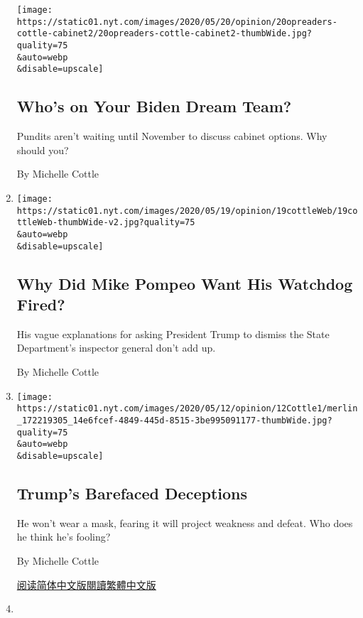 \begin{enumerate}
  \texttt{[image: https://static01.nyt.com/images/2020/05/20/opinion/20opreaders-cottle-cabinet2/20opreaders-cottle-cabinet2-thumbWide.jpg?quality=75\\\&auto=webp\\\&disable=upscale]}

  \hypertarget{whos-on-your-biden-dream-team}{%
  \subsection{Who's on Your Biden Dream
  Team?}\label{whos-on-your-biden-dream-team}}

  Pundits aren't waiting until November to discuss cabinet options. Why
  should you?

  By Michelle Cottle
\item
  \href{/2020/05/19/opinion/pompeo-state-department-inspector-general.html}{}

  \texttt{[image: https://static01.nyt.com/images/2020/05/19/opinion/19cottleWeb/19cottleWeb-thumbWide-v2.jpg?quality=75\\\&auto=webp\\\&disable=upscale]}

  \hypertarget{why-did-mike-pompeo-want-his-watchdog-fired}{%
  \subsection{Why Did Mike Pompeo Want His Watchdog
  Fired?}\label{why-did-mike-pompeo-want-his-watchdog-fired}}

  His vague explanations for asking President Trump to dismiss the State
  Department's inspector general don't add up.

  By Michelle Cottle
\item
  \href{/2020/05/12/opinion/trump-pence-coronavirus-masks.html}{}

  \texttt{[image: https://static01.nyt.com/images/2020/05/12/opinion/12Cottle1/merlin\_172219305\_14e6fcef-4849-445d-8515-3be995091177-thumbWide.jpg?quality=75\\\&auto=webp\\\&disable=upscale]}

  \hypertarget{trumps-barefaced-deceptions}{%
  \subsection{Trump's Barefaced
  Deceptions}\label{trumps-barefaced-deceptions}}

  He won't wear a mask, fearing it will project weakness and defeat. Who
  does he think he's fooling?

  By Michelle Cottle

  \href{https://cn.nytimes.com/opinion/20200513/trump-pence-coronavirus-masks/}{阅读简体中文版}\href{https://cn.nytimes.com/opinion/20200513/trump-pence-coronavirus-masks/zh-hant/}{閱讀繁體中文版}
\item
  \href{/2020/04/30/opinion/coronavirus-trump-republicans.html}{}


\end{enumerate}
